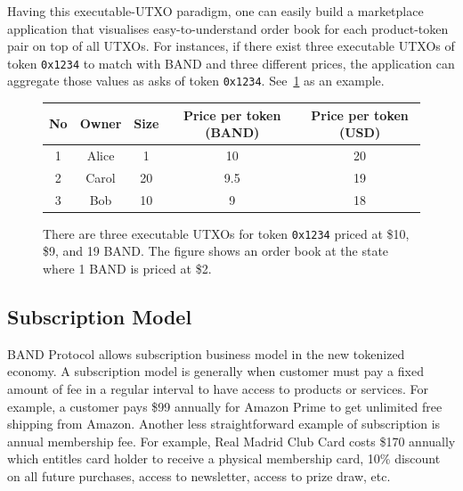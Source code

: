 \documentclass[letterpaper,11pt]{article}
\begin{document}
Having this executable-UTXO paradigm, one can easily build a marketplace application that visualises easy-to-understand order book for each product-token pair on top of all UTXOs. For instances, if there exist three executable UTXOs of token {\tt 0x1234} to match with BAND and three different prices, the application can aggregate those values as asks of token {\tt 0x1234}. See~\cref{fig:marketplace-ex} as an example.

\begin{figure}[!h]
\centering
{}
\begin{tabular}{ c | c | c | c | c }
No & Owner & Size & Price per token (BAND) & Price per token (USD) \\ \hline
1& Alice & 1 & 10 & 20 \\
2 & Carol & 20 & 9.5 & 19 \\
3 &Bob & 10 & 9 & 18 \\
\end{tabular}
\caption{There are three executable UTXOs for token {\tt 0x1234} priced at \$10, \$9, and 19 BAND. The figure shows an order book at the state where 1 BAND is priced at \$2.}
\label{fig:marketplace-ex}
\end{figure}
\subsection{Subscription Model} \label{sec:subscription-model}
BAND Protocol allows subscription business model in the new tokenized economy. A subscription model is generally when customer must pay a fixed amount of fee in a regular interval to have access to products or services. For example, a customer pays \$99 annually for Amazon Prime to get unlimited free shipping from Amazon. Another less straightforward example of subscription is annual membership fee. For example, Real Madrid Club Card costs \$170 annually which entitles card holder to receive a physical membership card, 10\% discount on all future purchases, access to newsletter, access to prize draw, etc.
\end{document}
